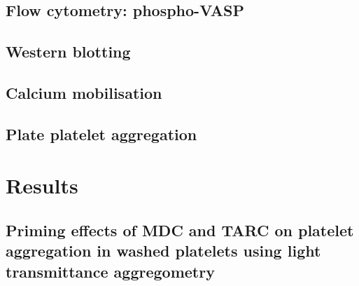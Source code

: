 \documentclass[11pt,twoside]{bristolthesis}
\begin{document}
\hypertarget{flow-cytometry-phospho-vasp}{%
\subsection{Flow cytometry: phospho-VASP}\label{flow-cytometry-phospho-vasp}}

\hypertarget{western-blotting}{%
\subsection{Western blotting}\label{western-blotting}}

\hypertarget{calcium-mobilisation}{%
\subsection{Calcium mobilisation}\label{calcium-mobilisation}}

\hypertarget{plate-platelet-aggregation}{%
\subsection{Plate platelet aggregation}\label{plate-platelet-aggregation}}

\hypertarget{results-2}{%
\section{Results}\label{results-2}}

\hypertarget{priming-effects-of-mdc-and-tarc-on-platelet-aggregation-in-washed-platelets-using-light-transmittance-aggregometry}{%
\subsection{Priming effects of MDC and TARC on platelet aggregation in washed platelets using light transmittance aggregometry}\label{priming-effects-of-mdc-and-tarc-on-platelet-aggregation-in-washed-platelets-using-light-transmittance-aggregometry}}
\end{document}
